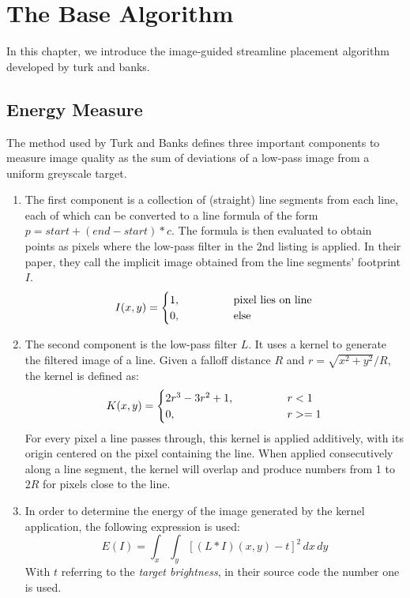 \section{The Base Algorithm}

In this chapter, we introduce the image-guided streamline placement algorithm developed by turk and banks.

\subsection{Energy Measure}
The method used by Turk and Banks defines three important components to measure image quality as the sum of deviations of a low-pass image from a uniform greyscale target.
\begin{enumerate}
    \item The first component is a collection of (straight) line segments from each line,
    each of which can be converted to a line formula of the form $p = start + (end - start) * c$.
    The formula is then evaluated to obtain points as pixels where the low-pass filter in the 2nd listing is applied.
    In their paper, they call the implicit image obtained from the line segments' footprint $I$.
    \begin{equation*}
        I(x,y) = \begin{cases}
            1, \kern4em & \text{pixel lies on line}\\
            0,          & \text{else}
    \end{cases}
    \end{equation*}
    
    \item The second component is the low-pass filter $L$.
    It uses a kernel to generate the filtered image of a line.
    Given a falloff distance $R$ and $r=\sqrt{x^2+y^2} / R$, the kernel is defined as:
    \begin{equation*}
        K(x,y) = \begin{cases}
            2r^3 - 3r^2 + 1, \kern4em & r < 1\\
            0,               & r >= 1
        \end{cases}
    \end{equation*}
    For every pixel a line passes through, this kernel is applied additively, with its origin centered on the pixel containing the line.
    When applied consecutively along a line segment, the kernel will overlap and produce numbers from 1 to $2R$ for pixels close to the line.
    
    \item In order to determine the energy of the image generated by the kernel application, the following expression is used:
    \begin{equation*}
        E(I) = \int_x\int_y\left[(L\ast I)(x,y)-t\right]^2\,dx\,dy
    \end{equation*}
    With $t$ referring to the \textit{target brightness}, in their source code the number one is used.
\end{enumerate}
